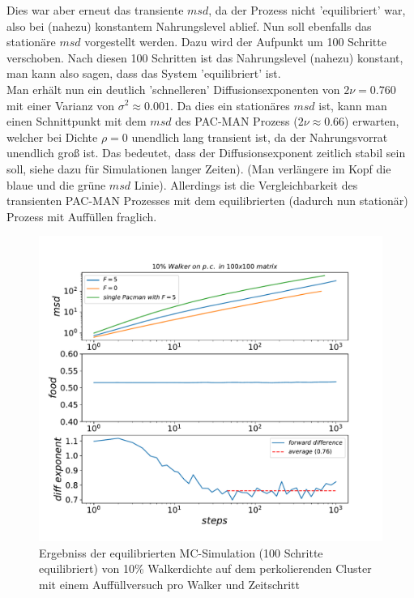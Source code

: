 \documentclass[a4paper, 12pt]{report}
\begin{document}
\noindent Dies war aber erneut das transiente $msd$, da der Prozess nicht 'equilibriert' war, also bei (nahezu) konstantem Nahrungslevel ablief. Nun soll ebenfalls das stationäre $msd$ vorgestellt werden. Dazu wird der Aufpunkt um 100 Schritte verschoben. Nach diesen 100 Schritten ist das Nahrungslevel (nahezu) konstant, man kann also sagen, dass das System 'equilibriert' ist.
\\
Man erhält nun ein deutlich 'schnelleren' Diffusionsexponenten von  $2\nu = 0.760$ mit einer Varianz von  $\sigma^2 \approx 0.001$. Da dies ein stationäres $msd$ ist, kann man einen Schnittpunkt mit dem $msd$ des PAC-MAN Prozess ($2\nu \approx 0.66$) erwarten, welcher bei Dichte $\rho=0$ unendlich lang transient ist, da der Nahrungsvorrat unendlich groß ist. Das bedeutet, dass der Diffusionsexponent zeitlich stabil sein soll, siehe dazu \cite{doi:10.1063/1.4999485} für Simulationen langer Zeiten). (Man verlängere im Kopf die blaue und die grüne $msd$ Linie). Allerdings ist die Vergleichbarkeit des transienten PAC-MAN Prozesses mit dem equilibrierten (dadurch nun stationär) Prozess mit Auffüllen fraglich.

\begin{figure}[H]
	\centering
	\includegraphics[scale=0.7]{new_food10_shifted100_new.pdf}
	\caption{Ergebniss der equilibrierten MC-Simulation (100 Schritte equilibriert) von 10\% Walkerdichte auf dem perkolierenden Cluster mit einem Auffüllversuch pro Walker und Zeitschritt}
\end{figure}
\clearpage
\end{document}

